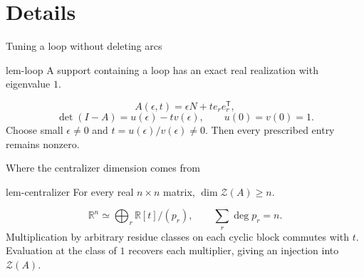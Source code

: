 \documentclass{beamer}
\begin{document}
\section{Details}
\begin{frame}{Tuning a loop without deleting arcs}
\begin{bookresult}{lem-loop}
A support containing a loop has an exact real realization with eigenvalue $1$.
\end{bookresult}
\[
 A(\epsilon,t)=\epsilon N+t e_re_r^{\mathsf T},
\]
\[
 \det(I-A)=u(\epsilon)-t v(\epsilon),\qquad u(0)=v(0)=1.
\]
Choose small $\epsilon\ne0$ and $t=u(\epsilon)/v(\epsilon)\ne0$. Then every prescribed entry remains nonzero.
\end{frame}
\begin{frame}{Where the centralizer dimension comes from}
\begin{bookresult}{lem-centralizer}
For every real $n\times n$ matrix, $\dim\mathcal Z(A)\geq n$.
\end{bookresult}
\[
 \mathbb R^n\simeq\bigoplus_r\mathbb R[t]/(p_r),\qquad
 \sum_r\deg p_r=n.
\]
Multiplication by arbitrary residue classes on each cyclic block commutes with $t$. Evaluation at the class of $1$ recovers each multiplier, giving an injection into $\mathcal Z(A)$.
\end{frame}
\FormalVerification
\end{document}
